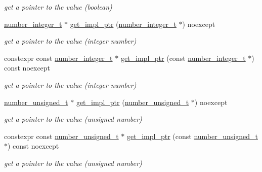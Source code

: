 \begin{DoxyCompactItemize}
\begin{DoxyCompactList}\small\item\em get a pointer to the value (boolean) \end{DoxyCompactList}\item 
\hyperlink{classnlohmann_1_1basic__json_ac4b10b2364f26ce47bdb9a413ff04a59}{number\+\_\+integer\+\_\+t} $\ast$ \hyperlink{classnlohmann_1_1basic__json_abc4941c0dd9392b813a34ce8d9719eef}{get\+\_\+impl\+\_\+ptr} (\hyperlink{classnlohmann_1_1basic__json_ac4b10b2364f26ce47bdb9a413ff04a59}{number\+\_\+integer\+\_\+t} $\ast$) noexcept
\begin{DoxyCompactList}\small\item\em get a pointer to the value (integer number) \end{DoxyCompactList}\item 
constexpr const \hyperlink{classnlohmann_1_1basic__json_ac4b10b2364f26ce47bdb9a413ff04a59}{number\+\_\+integer\+\_\+t} $\ast$ \hyperlink{classnlohmann_1_1basic__json_af7b8bce54a5e697e3f613f8fbcf046b8}{get\+\_\+impl\+\_\+ptr} (const \hyperlink{classnlohmann_1_1basic__json_ac4b10b2364f26ce47bdb9a413ff04a59}{number\+\_\+integer\+\_\+t} $\ast$) const  noexcept
\begin{DoxyCompactList}\small\item\em get a pointer to the value (integer number) \end{DoxyCompactList}\item 
\hyperlink{classnlohmann_1_1basic__json_a60a04166c122072ab11eaf9845d9cd1d}{number\+\_\+unsigned\+\_\+t} $\ast$ \hyperlink{classnlohmann_1_1basic__json_a4a99eaec8caf57b146898f542affe0f8}{get\+\_\+impl\+\_\+ptr} (\hyperlink{classnlohmann_1_1basic__json_a60a04166c122072ab11eaf9845d9cd1d}{number\+\_\+unsigned\+\_\+t} $\ast$) noexcept
\begin{DoxyCompactList}\small\item\em get a pointer to the value (unsigned number) \end{DoxyCompactList}\item 
constexpr const \hyperlink{classnlohmann_1_1basic__json_a60a04166c122072ab11eaf9845d9cd1d}{number\+\_\+unsigned\+\_\+t} $\ast$ \hyperlink{classnlohmann_1_1basic__json_ab9d05b5bfdb0916af5182b2ff9e99fd2}{get\+\_\+impl\+\_\+ptr} (const \hyperlink{classnlohmann_1_1basic__json_a60a04166c122072ab11eaf9845d9cd1d}{number\+\_\+unsigned\+\_\+t} $\ast$) const  noexcept
\begin{DoxyCompactList}\small\item\em get a pointer to the value (unsigned number) \end{DoxyCompactList}\item 

\end{DoxyCompactItemize}
